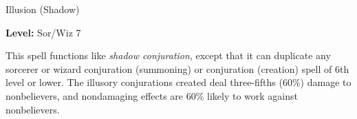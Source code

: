 \label{spell:Greater Shadow Conjuration}

Illusion (Shadow)

\textbf{Level:} Sor/Wiz 7

This spell functions like \textit{shadow conjuration}, except that it can duplicate 
any sorcerer or wizard conjuration (summoning) or conjuration (creation) spell 
of 6th level or lower. The illusory conjurations created deal three-fifths (60\%) 
damage to nonbelievers, and nondamaging effects are 60\% likely to work against 
nonbelievers.

